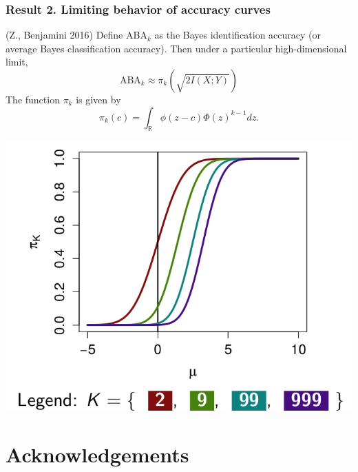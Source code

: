 \documentclass{beamer}
\begin{document}
\begin{frame}
\begin{center}
\begin{tabular}{cc}
\end{tabular}
\end{center}
\end{frame}

\begin{frame}
\frametitle{Result 2. Limiting behavior of accuracy curves} 
(Z., Benjamini 2016)  Define
$\text{ABA}_k$ as the Bayes identification accuracy (or average Bayes
classification accuracy).  Then under a particular high-dimensional
limit,
\begin{equation}\label{abepi}
\text{ABA}_k \approx \pi_k(\sqrt{2 I(X; Y)})
\end{equation}
The function $\pi_k$ is given by
\[
\pi_k(c) = \int_{\mathbb{R}} \phi(z - c)  \Phi(z)^{k-1} dz.
\]
\begin{center}
\includegraphics[scale = 0.2]{piK.png}
\end{center}
\end{frame}

\section*{Acknowledgements}

\begin{frame}
\sectionpage
\end{frame}
\end{document}
